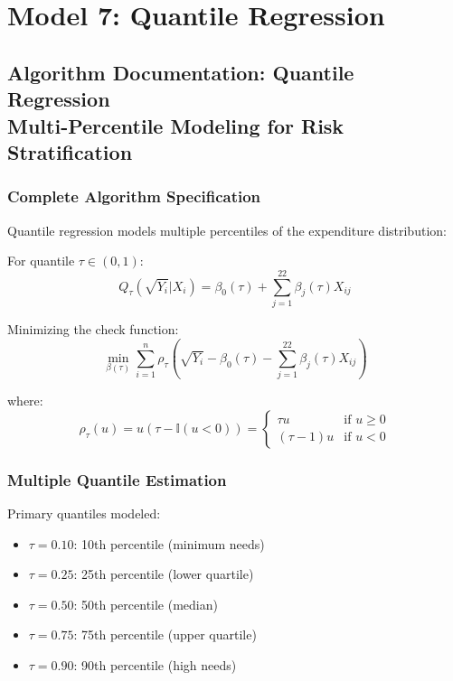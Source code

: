 \chapter{Model 7: Quantile Regression}\newpage

\section{Algorithm Documentation: Quantile Regression\\ Multi-Percentile Modeling for Risk Stratification}

\subsection{Complete Algorithm Specification}

Quantile regression models multiple percentiles of the expenditure distribution:

For quantile $\tau \in (0,1)$:
\begin{equation}
Q_{\tau}(\sqrt{Y_i} | X_i) = \beta_0(\tau) + \sum_{j=1}^{22} \beta_j(\tau) X_{ij}
\end{equation}

Minimizing the check function:
\begin{equation}
\min_{\beta(\tau)} \sum_{i=1}^n \rho_\tau\left(\sqrt{Y_i} - \beta_0(\tau) - \sum_{j=1}^{22} \beta_j(\tau) X_{ij}\right)
\end{equation}

where:
\begin{equation}
\rho_\tau(u) = u(\tau - \mathbb{I}(u < 0)) = \begin{cases}
\tau u & \text{if } u \geq 0 \\
(\tau - 1) u & \text{if } u < 0
\end{cases}
\end{equation}

\subsection{Multiple Quantile Estimation}

Primary quantiles modeled:
\begin{itemize}
    \item $\tau = 0.10$: 10th percentile (minimum needs)
    \item $\tau = 0.25$: 25th percentile (lower quartile)
    \item $\tau = 0.50$: 50th percentile (median)
    \item $\tau = 0.75$: 75th percentile (upper quartile)
    \item $\tau = 0.90$: 90th percentile (high needs)
\end{itemize}

